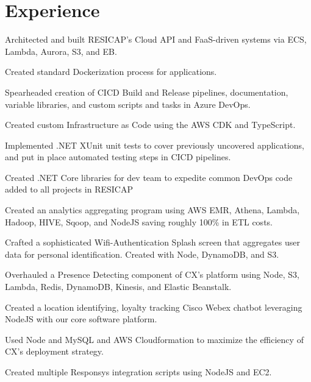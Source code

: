 \documentclass[]{deedy-resume-openfont}
\begin{document}
\begin{minipage}[t]{0.66\textwidth} 


\section{Experience}

\vspace{\topsep} %
\begin{tightemize}
\item Architected and built RESICAP's Cloud API and FaaS-driven systems via ECS, Lambda, Aurora, S3, and EB.
\item Created standard Dockerization process for applications.
\item Spearheaded creation of CICD Build and Release pipelines, documentation, variable libraries, and custom scripts and tasks in Azure DevOps.
\item Created custom Infrastructure as Code using the AWS CDK and TypeScript.
\item Implemented .NET XUnit unit tests to cover previously uncovered applications, and put in place automated testing steps in CICD pipelines.
\item Created .NET Core libraries for dev team to expedite common DevOps code added to all projects in RESICAP
\end{tightemize}

\sectionsep

\vspace{\topsep} %
\begin{tightemize}
\item Created an analytics aggregating program using AWS EMR, Athena, Lambda, Hadoop, HIVE, Sqoop, and NodeJS  saving roughly 100\% in ETL costs.
\item Crafted a sophisticated Wifi-Authentication Splash screen that aggregates user data for personal identification. Created with Node, DynamoDB, and S3.
\item Overhauled a Presence Detecting component of CX's platform using Node, S3, Lambda, Redis, DynamoDB, Kinesis, and Elastic Beanstalk.
\item Created a location identifying, loyalty tracking Cisco Webex chatbot leveraging NodeJS with our core software platform.
\item Used Node and MySQL and AWS Cloudformation to maximize the efficiency of CX's deployment strategy.
\item Created multiple Responsys integration scripts using NodeJS and EC2.
\end{tightemize}
\sectionsep


\end{minipage}
\end{document}
